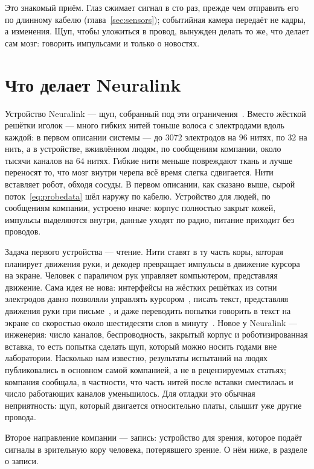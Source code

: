 Это знакомый приём. Глаз сжимает сигнал в сто раз, прежде чем отправить его по длинному кабелю (глава~\ref{sec:sensors}); событийная камера передаёт не кадры, а изменения. Щуп, чтобы уложиться в провод, вынужден делать то же, что делает сам мозг: говорить импульсами и только о новостях.

\section{Что делает Neuralink}

Устройство Neuralink --- щуп, собранный под эти ограничения~\cite{Musk2019}. Вместо жёсткой решётки иголок --- много гибких нитей тоньше волоса с электродами вдоль каждой: в первом описании системы --- до $3072$ электродов на $96$ нитях, по $32$ на нить, а в устройстве, вживлённом людям, по сообщениям компании, около тысячи каналов на $64$ нитях. Гибкие нити меньше повреждают ткань и лучше переносят то, что мозг внутри черепа всё время слегка сдвигается. Нити вставляет робот, обходя сосуды. В первом описании, как сказано выше, сырой поток~\eqref{eq:probedata} шёл наружу по кабелю. Устройство для людей, по сообщениям компании, устроено иначе: корпус полностью закрыт кожей, импульсы выделяются внутри, данные уходят по радио, питание приходит без проводов.

Задача первого устройства --- чтение. Нити ставят в ту часть коры, которая планирует движения руки, и декодер превращает импульсы в движение курсора на экране. Человек с параличом рук управляет компьютером, представляя движение. Сама идея не нова: интерфейсы на жёстких решётках из сотни электродов давно позволяли управлять курсором~\cite{Hochberg2006}, писать текст, представляя движения руки при письме~\cite{Willett2021}, и даже переводить попытки говорить в текст на экране со скоростью около шестидесяти слов в минуту~\cite{Willett2023}. Новое у Neuralink --- инженерия: число каналов, беспроводность, закрытый корпус и роботизированная вставка, то есть попытка сделать щуп, который можно носить годами вне лаборатории. Насколько нам известно, результаты испытаний на людях публиковались в основном самой компанией, а не в рецензируемых статьях; компания сообщала, в частности, что часть нитей после вставки сместилась и число работающих каналов уменьшилось. Для отладки это обычная неприятность: щуп, который двигается относительно платы, слышит уже другие провода.

Второе направление компании --- запись: устройство для зрения, которое подаёт сигналы в зрительную кору человека, потерявшего зрение. О нём ниже, в разделе о записи.

